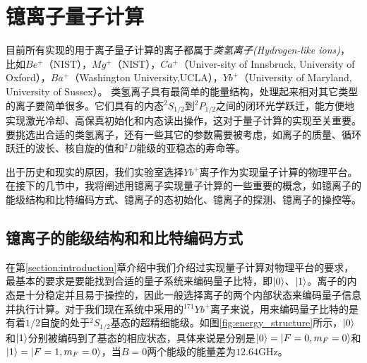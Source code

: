 
\chapter[镱离子量子计算]{镱离子量子计算\label{section:yb_computation}}

目前所有实现的用于离子量子计算的离子都属于\emph{类氢离子(Hydrogen-like ions)}， 比如$Be^+$（NIST\cite[]{Monroe_Meekhof_King_Itano_Wineland_2002,Lin_Gaebler_Reiter_Tan_Bowler_Wan_Keith_Knill_Glancy_Coakley_et_al_2016}），$Mg^+$（NIST\cite[]{Barrett_Schaetz_DeMarco_Britton_Chiaverini_Itano_Jelenkovic_Jost_Langer_Leibfried_et_al_2003, Wan_Kienzler_Erickson_Mayer_Tan_Wu_Vasconcelos_Glancy_Knill_Wineland_et_al_2019}），$Ca^+$（Univer-sity of Innsbruck\cite[]{Lanyon_Hempel_Nigg_Müller_Gerritsma_Zähringer_Schindler_Barreiro_Rambach_Kirchmair_et_al_2011,Monz_Nigg_Martinez_Brandl_Schindler_Rines_Wang_Chuang_Blatt_2016}, University of Oxford\cite[]{Ballance_Harty_Linke_Sepiol_Lucas_2016,Schäfer_Ballance_Thirumalai_Stephenson_Ballance_Steane_Lucas_2018}），$Ba^+$（Washington University\cite[]{Dietrich_2009,Dietrich_Kurz_Noel_Shu_Blinov_2010},UCLA\cite[]{Hucul_Christensen_Hudson_Campbell_2017}），$Yb^+$（University of Maryland\cite[]{Olmschenk_Younge_Moehring_Matsukevich_Maunz_Monroe_2007,Debnath_Linke_Figgatt_Landsman_Wright_Monroe_2016}, University of Sussex\cite[]{Weidt_Randall_Webster_Lake_Webb_Cohen_Navickas_Lekitsch_Retzker_Hensinger_2016}）。
类氢离子具有最简单的能量结构，处理起来相对其它类型的离子要简单很多。它们具有的内态$^2S_{1/2}$到$^2P_{1/2}$之间的闭环光学跃迁，能方便地实现激光冷却、高保真初始化和内态读出操作\cite[]{Harty_Allcock_Ballance_Guidoni_Janacek_Linke_Stacey_Lucas_2014}，这对于量子计算的实现至关重要。要挑选出合适的类氢离子，还有一些其它的参数需要被考虑，如离子的质量、循环跃迁的波长、核自旋的值和$^2D$能级的亚稳态的寿命等\cite[]{Bruzewicz_Chiaverini_McConnell_Sage_2019}。

出于历史和现实的原因，我们实验室选择$Yb^+$离子作为实现量子计算的物理平台。
在接下的几节中，我将阐述用镱离子实现量子计算的一些重要的概念，如镱离子的能级结构和比特编码方式、镱离子的态初始化、镱离子的探测、镱离子的操控等。

\section[镱离子的能级结构和和比特编码方式]{镱离子的能级结构和和比特编码方式}
在第\ref{section:introduction}章介绍中我们介绍过实现量子计算对物理平台的要求，最基本的要求是要能找到合适的量子系统来编码量子比特，即$\ket{0}$、$\ket{1}$。离子的内态是十分稳定并且易于操控的，因此一般选择离子的两个内部状态来编码量子信息并执行计算。对于我们现在系统中采用的$^{171}Yb^+$离子来说，用来编码量子比特的是有着$1/2$自旋的处于$^2S_{1/2}$基态的超精细能级\cite[]{Olmschenk_Younge_Moehring_Matsukevich_Maunz_Monroe_2007}。如图\ref{fig:energy_structure}所示，$\ket{0}$和$\ket{1}$分别被编码到了基态的相应状态，具体来说是分别是$\ket{0}=\ket{F=0,m_F=0}$和$\ket{1}=\ket{F=1,m_F=0}$，当$B=0$两个能级的能量差为$12.64$GHz。

